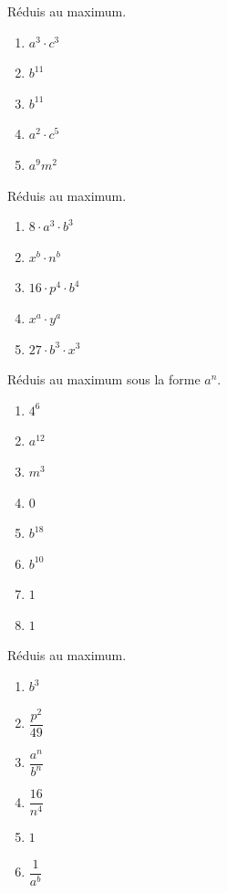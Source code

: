 \documentclass[12pt,parskip=half-, twoside=semi]{scrartcl}
\begin{document}
\setcounter{exercise}{0}

\begin{exercise}
  Réduis au maximum.
  \begin{enumerate}[cols=5]
    \item \(a^{3} \cdot c^{3}\)
    \item \(b^{11} \)
    \item \(b^{11} \)
    \item \(a^{2} \cdot c^{5} \)
    \item \(a^{9}m^{2} \)
  \end{enumerate}
\end{exercise}

\begin{exercise}
  Réduis au maximum.
  \begin{enumerate}[cols=5]
    \item \(8 \cdot a^{3} \cdot b^{3}\)
    \item \(x^{b} \cdot n^{b} \)
    \item \(16 \cdot p^{4} \cdot b^{4} \)
    \item \(x^{a} \cdot y^{a} \)
    \item \(27 \cdot b^{3} \cdot x^{3} \)    
  \end{enumerate}
\end{exercise}

\begin{exercise}
  Réduis au maximum sous la forme $a^n$.
  \begin{enumerate}[cols=6]
    \item \(4^{6} \)
    \item \(a^{12} \)
    \item \(m^{3} \)
    \item \(0\)
    \item \(b^{18}\)
    \item \(b^{10} \)
    \item \(1\)
    \item \(1\)
  \end{enumerate}
\end{exercise}

\begin{exercise}
  Réduis au maximum.
  \begin{enumerate}[cols=6]
    \item \(b^{3}\)
    \item \(\dfrac{p^{2}}{49}  \)
    \item \(\dfrac{a^{n}}{b^{n}}\)
    \item \(\dfrac{16}{n^{4}}\)
    \item \(1\)
    \item \(\dfrac{1}{a^{b}}\)
  \end{enumerate}
\end{exercise}
\end{document}
